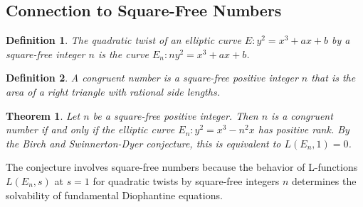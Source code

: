 \documentclass{article}
\newtheorem{definition}{Definition}
\newtheorem{theorem}{Theorem}
\begin{document}
\subsection{Connection to Square-Free Numbers}

\begin{definition}
  The quadratic twist of an elliptic curve $E : y^2 = x^3 + ax + b$ by a
  square-free integer $n$ is the curve $E_n : ny^2 = x^3 + ax + b$.
\end{definition}

\begin{definition}
  A congruent number is a square-free positive integer $n$ that is the area of
  a right triangle with rational side lengths.
\end{definition}

\begin{theorem}
  Let $n$ be a square-free positive integer. Then $n$ is a congruent number if
  and only if the elliptic curve $E_n : y^2 = x^3 - n^2 x$ has positive rank.
  By the Birch and Swinnerton-Dyer conjecture, this is equivalent to $L (E_n,
  1) = 0$.
\end{theorem}

The conjecture involves square-free numbers because the behavior of
L-functions $L (E_n, s)$ at $s = 1$ for quadratic twists by square-free
integers $n$ determines the solvability of fundamental Diophantine equations.
\end{document}
